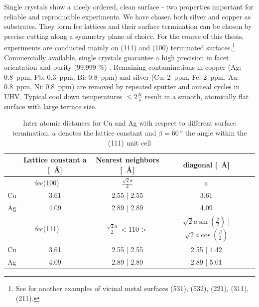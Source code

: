 Single crystals show a nicely ordered, clean surface - two properties important for reliable and reproducible experiments. We have chosen both silver and copper as substrates. They form fcc lattices and their surface termination can be chosen by precise cutting along a symmetry plane of choice. For the course of this thesis, experiments are conducted mainly on (111) and (100) terminated surfaces.\footnote{See \cite{riemann_ionic_2002} for another examples of vicinal metal surfaces (531), (532), (221), (311), (211).} Commercially available, single crystals guarantee a high precision in facet orientation and purity (99.999 \%) \cite{mateck}. Remaining contaminations in copper (Ag: \SI{0.8}{ppm}, Pb: \SI{0.3}{ppm}, Bi: \SI{0.8}{ppm}) and silver (Cu: \SI{2}{ppm}, Fe: \SI{2}{ppm}, Au: \SI{0.8}{ppm}, Ni: \SI{0.8}{ppm}) are removed by repeated sputter and anneal cycles in UHV. Typical cool down temperatures $\leq 2 \frac{K}{s}$ result in a smooth, atomically flat surface with large terrace size.

\begin{table}
\centering {}
\caption{Inter atomic distances for Cu and Ag with respect to different surface termination. $a$ denotes the lattice constant and $\beta= \SI{60}{\degree}$ the angle within the (111) unit cell}
  \begin{tabular}{ccccc}
& Lattice constant a [\SI{}{\angstrom}] & Nearest neighbors [\SI{}{\angstrom}] & diagonal [\SI{}{\angstrom}]\\ \hline 
\multicolumn{2}{c}{fcc(100)} & $\frac{\sqrt{2}a}{2}$ & a \\
  Cu	 	& 3.61	& 2.55 | 2.55 & 3.61  \\
  Ag		& 4.09	& 2.89 | 2.89 & 4.09 \\ \hline 
\multicolumn{2}{c}{fcc(111)} & $\frac{\sqrt{2}a}{2} \ <110>$ & $\sqrt{2}a\sin(\frac{\beta}{2})$ | $\sqrt{2}a\cos(\frac{\beta}{2})$\\
Cu 		& 3.61	& 2.55 | 2.55	& 2.55 | 4.42 \\
Ag		& 4.09	& 2.89 | 2.89	& 2.89 | 5.01 \\ \hline
%
 \end{tabular}
\end{table}

